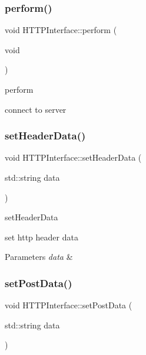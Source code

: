 \subsubsection{\texorpdfstring{perform()}{perform()}}
{\footnotesize\ttfamily void H\+T\+T\+P\+Interface\+::perform (\begin{DoxyParamCaption}\item[{void}]{ }\end{DoxyParamCaption})}



perform 

connect to server \mbox{\label{classAuth_1_1HTTPInterface_a1e32cd183942b8705785280ef6ee4d41}} 
\subsubsection{\texorpdfstring{set\+Header\+Data()}{setHeaderData()}}
{\footnotesize\ttfamily void H\+T\+T\+P\+Interface\+::set\+Header\+Data (\begin{DoxyParamCaption}\item[{std\+::string}]{data }\end{DoxyParamCaption})}



set\+Header\+Data 

set http header data 
\begin{DoxyParams}{Parameters}
{\em data} & \\
\hline
\end{DoxyParams}
\mbox{\label{classAuth_1_1HTTPInterface_a44a5ec483fcd6088e13a372f651d87d7}} 
\subsubsection{\texorpdfstring{set\+Post\+Data()}{setPostData()}}
{\footnotesize\ttfamily void H\+T\+T\+P\+Interface\+::set\+Post\+Data (\begin{DoxyParamCaption}\item[{std\+::string}]{data }\end{DoxyParamCaption})}



